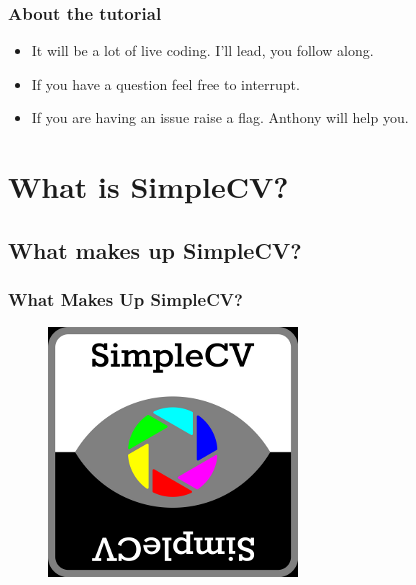 \documentclass{beamer}
\begin{document}
\begin{frame}
  \frametitle{About the tutorial}
  \begin{itemize}
    \item It will be a lot of live coding. I'll lead, you follow along.
    \item If you have a question feel free to interrupt. 
    \item If you are having an issue raise a flag. Anthony will help
      you. 
    \end{itemize}
\end{frame}


\section{What is SimpleCV?} %

\subsection{What makes up SimpleCV?} %

\begin{frame}
\frametitle{What Makes Up SimpleCV?}
\begin{figure}
\includegraphics[width=0.5\linewidth]{simplecv.png}
\end{figure}
\end{frame}
\end{document}
